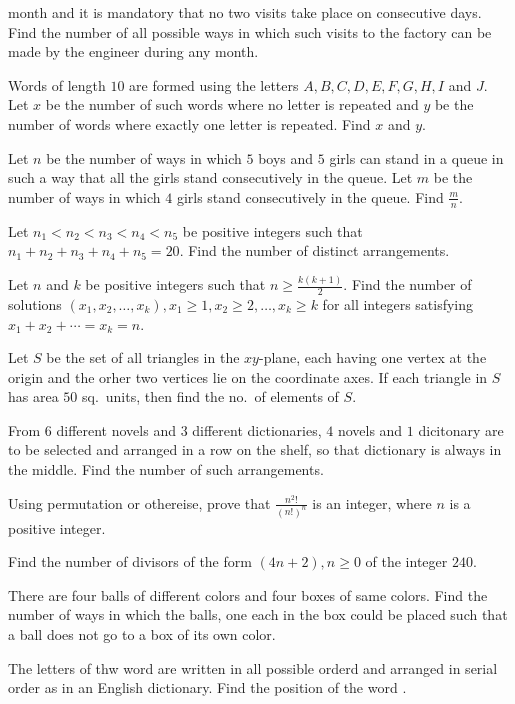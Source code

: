   month and it is mandatory that no two visits take place on consecutive days. Find the number of all
  possible ways in which such visits to the factory can be made by the engineer during any month.
\item Words of length $10$ are formed using the letters $A, B, C, D, E, F, G, H, I$ and $J$. Let $x$ be the
  number of such words where no letter is repeated and $y$ be the number of words where exactly one letter
  is repeated. Find $x$ and $y$.
\item Let $n$ be the number of ways in which $5$ boys and $5$ girls can stand in a queue in such a way that
  all the girls stand consecutively in the queue. Let $m$ be the number of ways in which $4$ girls stand
  consecutively in the queue. Find $\frac{m}{n}$.
\item Let $n_1 < n_2 < n_3 < n_4 < n_5$ be positive integers such that $n_1 + n_2 + n_3 + n_4 + n_5 =
  20$. Find the number of distinct arrangements.
\item Let $n$ and $k$ be positive integers such that $n\geq \frac{k(k + 1)}{2}$. Find the number of
  solutions $(x_1, x_2, \ldots, x_k), x_1\geq 1, x_2\geq 2, \ldots, x_k\geq k$ for all integers satisfying
  $x_1 + x_2 + \cdots = x_k = n$.
\item Let $S$ be the set of all triangles in the $xy$-plane, each having one vertex at the origin and the
  orher two vertices lie on the coordinate axes. If each triangle in $S$ has area $50$ sq.\ units, then find
  the no.\ of elements of $S$.
\item From $6$ different novels and $3$ different dictionaries, $4$ novels and $1$ dicitonary are to be
  selected and arranged in a row on the shelf, so that dictionary is always in the middle. Find the number
  of such arrangements.
\item Using permutation or othereise, prove that $\frac{n^2!}{(n!)^n}$ is an integer, where  $n$ is a
  positive integer.
\item Find the number of divisors of the form $(4n + 2), n\geq 0$ of the integer $240$.
\item There are four balls of different colors and four boxes of same colors. Find the number of ways in
  which the balls, one each in the box could be placed such that a ball does not go to a box of its own
  color.
\item The letters of thw word  are written in all possible orderd and arranged in serial
  order as in an English dictionary. Find the position of the word .
